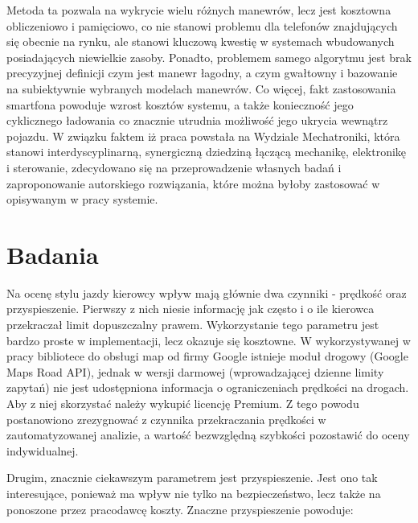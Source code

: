 Metoda ta pozwala na wykrycie wielu różnych manewrów, lecz jest kosztowna obliczeniowo i pamięciowo, co nie stanowi problemu dla telefonów znajdujących się obecnie na rynku, ale stanowi kluczową kwestię w systemach wbudowanych posiadających niewielkie zasoby. Ponadto, problemem samego algorytmu jest brak precyzyjnej definicji czym jest manewr łagodny, a czym gwałtowny i bazowanie na subiektywnie wybranych modelach manewrów. Co więcej, fakt zastosowania smartfona powoduje wzrost kosztów systemu, a także konieczność jego cyklicznego ładowania co znacznie utrudnia możliwość jego ukrycia wewnątrz pojazdu.
W związku faktem iż praca powstała na Wydziale Mechatroniki, która stanowi interdyscyplinarną, synergiczną dziedziną łączącą mechanikę, elektronikę i sterowanie, zdecydowano się na przeprowadzenie własnych badań i zaproponowanie autorskiego rozwiązania, które można byłoby zastosować w opisywanym w pracy systemie.

\section{Badania}
\label{experiments}

Na ocenę stylu jazdy kierowcy wpływ mają głównie dwa czynniki - prędkość oraz przyspieszenie. Pierwszy z nich niesie informację jak często i o ile kierowca przekraczał limit dopuszczalny prawem. Wykorzystanie tego parametru jest bardzo proste w implementacji, lecz okazuje się kosztowne. W wykorzystywanej w pracy bibliotece do obsługi map od firmy Google istnieje moduł drogowy (Google Maps Road API\cite{google_map_road_api}), jednak w wersji darmowej (wprowadzającej dzienne limity zapytań) nie jest udostępniona informacja o ograniczeniach prędkości na drogach. Aby z niej skorzystać należy wykupić licencję Premium. Z tego powodu postanowiono zrezygnować z czynnika przekraczania prędkości w zautomatyzowanej analizie, a wartość bezwzględną szybkości pozostawić do oceny indywidualnej.

Drugim, znacznie ciekawszym parametrem jest przyspieszenie. Jest ono tak interesujące, ponieważ ma wpływ nie tylko na bezpieczeństwo, lecz także na ponoszone przez pracodawcę koszty. Znaczne przyspieszenie powoduje:

